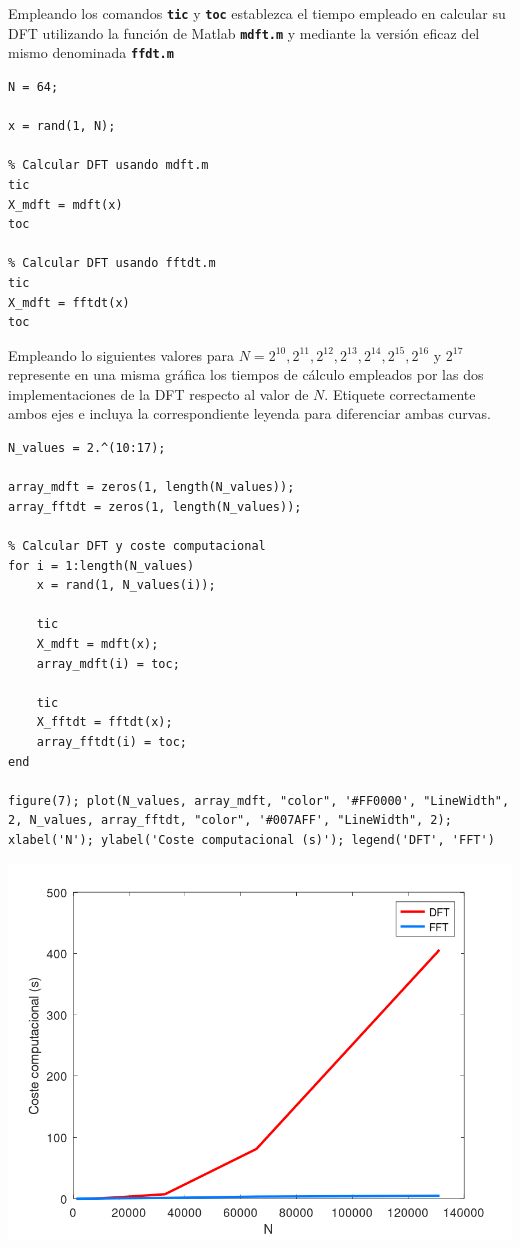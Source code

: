 \documentclass{article}
\newcommand{\code}[1]{\texttt{\textbf{#1}}}
\begin{document}
Empleando los comandos \code{tic} y \code{toc} establezca el tiempo empleado en calcular su DFT utilizando la función de Matlab \code{mdft.m} y mediante la versión eficaz del mismo denominada \code{ffdt.m}

\begin{lstlisting}
N = 64;

x = rand(1, N);

% Calcular DFT usando mdft.m
tic
X_mdft = mdft(x)
toc

% Calcular DFT usando fftdt.m
tic
X_mdft = fftdt(x)
toc
\end{lstlisting}

Empleando lo siguientes valores para $N=2^{10},2^{11},2^{12},2^{13},2^{14},2^{15},2^{16}$ y $2^{17}$ represente en una misma gráfica los tiempos de cálculo empleados por las dos implementaciones de la DFT respecto al valor de $N$. Etiquete correctamente ambos ejes e incluya la correspondiente leyenda para diferenciar ambas curvas.

\begin{lstlisting}
N_values = 2.^(10:17);

array_mdft = zeros(1, length(N_values));
array_fftdt = zeros(1, length(N_values));

% Calcular DFT y coste computacional
for i = 1:length(N_values)
    x = rand(1, N_values(i));

    tic
    X_mdft = mdft(x);
    array_mdft(i) = toc;

    tic
    X_fftdt = fftdt(x);
    array_fftdt(i) = toc;
end

figure(7); plot(N_values, array_mdft, "color", '#FF0000', "LineWidth", 2, N_values, array_fftdt, "color", '#007AFF', "LineWidth", 2);
xlabel('N'); ylabel('Coste computacional (s)'); legend('DFT', 'FFT')
\end{lstlisting}

\begin{center}
\includegraphics[width=0.7\linewidth]{Imágenes/Figura7}
\end{center}
\end{document}
